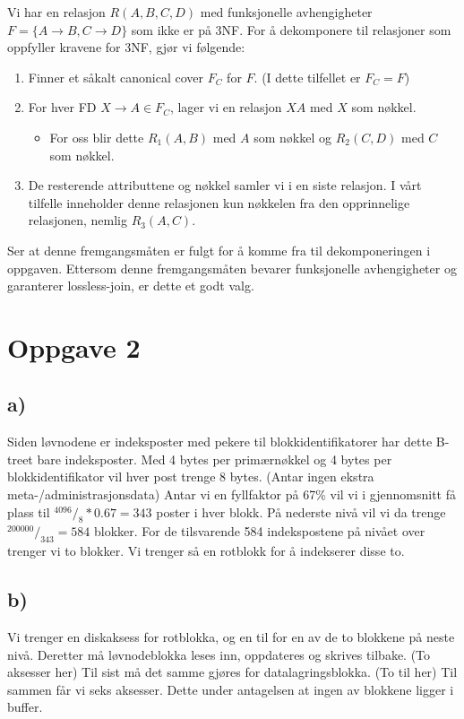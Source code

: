 \documentclass[a4paper, 12pt] {article}
\begin{document}
Vi har en relasjon $R(A,B,C,D)$ med funksjonelle avhengigheter $F = \{A \rightarrow B, C \rightarrow D\}$ som ikke er på 3NF. For å dekomponere til relasjoner som oppfyller kravene for 3NF, gjør vi følgende:

\begin{enumerate}
\item Finner et såkalt canonical cover $F_C$ for $F$. (I dette tilfellet er $F_C = F$)
\item For hver FD $X \rightarrow A \in F_C$, lager vi en relasjon $XA$ med $X$ som nøkkel.
    \begin{itemize}
    \item For oss blir dette $R_1(A,B)$ med $A$ som nøkkel og $R_2(C,D)$ med $C$ som nøkkel.
    \end{itemize}
\item De resterende attributtene og nøkkel samler vi i en siste relasjon. I vårt tilfelle inneholder denne relasjonen kun nøkkelen fra den opprinnelige relasjonen, nemlig $R_3(A,C)$.
\end{enumerate}

Ser at denne fremgangsmåten er fulgt for å komme fra til dekomponeringen i oppgaven. Ettersom denne fremgangsmåten bevarer funksjonelle avhengigheter og garanterer lossless-join, er dette et godt valg.

\section{Oppgave 2}
\subsection{a)}

Siden løvnodene er indeksposter med pekere til blokkidentifikatorer har dette B-treet bare indeksposter. Med 4 bytes per primærnøkkel og 4 bytes per blokkidentifikator vil hver post trenge 8 bytes. (Antar ingen ekstra meta-/administrasjonsdata) Antar vi en fyllfaktor på 67\% vil vi i gjennomsnitt få plass til $^{4096}/_{8} * 0.67 = 343$ poster i hver blokk. På nederste nivå vil vi da trenge $^{200000}/_{343} = 584$ blokker. For de tilsvarende 584 indekspostene på nivået over trenger vi to blokker. Vi trenger så en rotblokk for å indekserer disse to.

\subsection{b)}

Vi trenger en diskaksess for rotblokka, og en til for en av de to blokkene på neste nivå. Deretter må løvnodeblokka leses inn, oppdateres og skrives tilbake. (To aksesser her) Til sist må det samme gjøres for datalagringsblokka. (To til her) Til sammen får vi seks aksesser. Dette under antagelsen at ingen av blokkene ligger i buffer.
\end{document}
